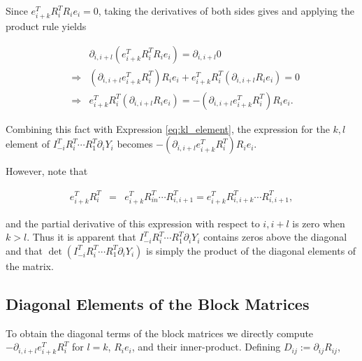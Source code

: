 \documentclass[ba]{imsart}
\numberwithin{equation}{section}
\theoremstyle{plain}
\begin{document}
\noindent Since  $e_{i+k}^T R_i^T R_i e_i =0$, taking the derivatives of both sides gives and applying the product rule yields

\begin{eqnarray}
&&\partial_{i,i+l} (e_{i+k}^T R_i^T R_i e_i) = \partial_{i,i+l} 0\nonumber \\
&\Rightarrow& (\partial_{i,i+l} e_{i+k}^T R_i^T) R_i e_i + e_{i+k}^T R_i^T ( \partial_{i,i+l}R_i e_i) = 0\nonumber \\
&\Rightarrow& e_{i+k}^T R_i^T  (\partial_{i,i+l}R_i e_i) = -(\partial_{i,i+l} e_{i+k}^T R_i^T) R_i e_i.
\end{eqnarray}

\noindent Combining this fact with Expression \ref{eq:kl_element}, the expression for the $k,l$ element of $I_{-i}^T R_i^T \cdots R_1^T \partial_{i} Y_i $ becomes $-(\partial_{i,i+l} e_{i+k}^T R_i^T) R_i e_i$.

\noindent However, note that

\begin{eqnarray}
e_{i+k}^T R_i^T &=&  e_{i+k}^T R_{in}^T \cdots R_{i,i+1}^T = e_{i+k}^T R_{i,i+k}^T \cdots R_{i,i+1}^T,
\end{eqnarray}

\noindent and the partial derivative of this expression with respect to $i,i+l$ is zero when $k > l$. Thus it is apparent that $I_{-i}^T R_i^T \cdots R_1^T \partial_{i} Y_i $ contains zeros above the diagonal and that $\det \left( I_{-i}^T R_i^T \cdots R_1^T \partial_{i} Y_i \right)$ is simply the product of the diagonal elements of the matrix.

\subsection{Diagonal Elements of the Block Matrices}
To obtain the diagonal terms of the block matrices we directly compute $-\partial_{i,i+l} e_{i+k}^T R_i^T$ for $l=k$, $R_i e_i$, and their inner-product. Defining $D_{ij} := \partial_{ij} R_{ij}$,
\end{document}
